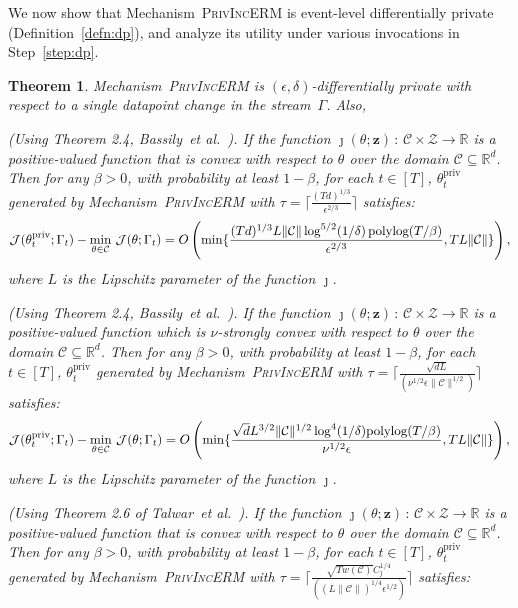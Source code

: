\documentclass{article}
\theoremstyle{plain}
\newenvironment{CompactEnumerate}{
\addtolength{\textheight}{.8in}
\addtolength{\textwidth}{.8in}
\addtolength{\oddsidemargin}{-.4in}
\addtolength{\evensidemargin}{-.4in}
\addtolength{\topmargin}{-.2in}

\begin{list}{\arabic{enumi}.}{%
\usecounter{enumi}
\setlength{\leftmargin}{12pt}
\setlength{\itemindent}{3pt}
\setlength{\topsep}{3pt}
\setlength{\itemsep}{1pt}
}}
{\end{list}}
\newtheorem{theorem}{Theorem}[section]
\def \PrivIncERM {\textsc{PrivIncERM}\xspace}
\def \polylog{\mbox{\rm polylog}}
\def \eps {\epsilon}
\def \z {\mathbf z}
\def \CCC {\mathcal{C}}
\def \ZZZ {\mathcal{Z}}
\def \JJJ {\mathcal{J}}
\def \priv {{\mathrm{priv}}}
\def \R {\mathbb{R}}
\begin{document}
We now show that Mechanism~\PrivIncERM is event-level differentially private (Definition~\ref{defn:dp}), and analyze its utility under various invocations in Step~\ref{step:dp}. 
\begin{theorem} \label{thm:thm1}  Mechanism~\PrivIncERM is $(\eps,\delta)$-differentially private with respect to a single datapoint change in the stream~$\Gamma$. Also,
\begin{CompactEnumerate}
\item \label{res:incerm1} (Using Theorem 2.4, Bassily~\emph{et al.}\ \cite{bassily2014differentially}).  If the function $\jmath(\theta;\z) \,:\, \CCC \times \ZZZ \rightarrow \R$ is a positive-valued function that is convex with respect to $\theta$ over the domain $\CCC \subseteq \R^d$. Then for any $\beta > 0$, with probability at least $1-\beta$, for each $t \in [T]$, $\theta^\priv_t$ generated by Mechanism~\PrivIncERM with $\tau = \lceil \frac{(Td)^{1/3}}{\eps^{2/3}} \rceil$ satisfies:
\begin{align*}
\JJJ(\theta^\priv_t; \Gamma_t) - \min_{\theta \in \CCC}\, \JJJ(\theta; \Gamma_t)  = O \left ( \min \{ \frac{(Td)^{1/3} L \| \CCC \| \log^{5/2}(1/\delta) \, \polylog(T/\beta)}{\eps^{2/3}}, T L \| \CCC \| \} \right),
\end{align*}
where $L$ is the Lipschitz parameter of the function $\jmath$.
\item \label{res:incerm2} (Using Theorem 2.4, Bassily~\emph{et al.}\ \cite{bassily2014differentially}). If the function $\jmath(\theta;\z) \,:\, \CCC \times \ZZZ \rightarrow \R$ is a positive-valued function which is $\nu$-strongly convex with respect to  $\theta$ over the domain $\CCC \subseteq \R^d$. Then for any $\beta > 0$, with probability at least $1-\beta$, for each $t \in [T]$, $\theta^\priv_t$ generated by Mechanism~\PrivIncERM with $\tau = \lceil \frac{\sqrt{d L}}{(\nu^{1/2} \eps \| \CCC \|^{1/2})} \rceil $ satisfies:
\begin{align*}
\JJJ(\theta^\priv_t; \Gamma_t) - \min_{\theta \in \CCC}\, \JJJ(\theta; \Gamma_t) = O \left ( \min \{\frac{\sqrt{d} L^{3/2} \| \CCC \|^{1/2} \log^4(1/\delta)\polylog(T/\beta)}{\nu^{1/2} \eps}, TL \| \CCC \| \} \right ),
\end{align*}
where $L$ is the Lipschitz parameter of the function $\jmath$.
\item \label{res:incerm3} (Using Theorem 2.6 of Talwar~\emph{et al.}\ \cite{talwar2015nearly}). If the function $\jmath(\theta;\z) \,:\, \CCC \times \ZZZ \rightarrow \R$ is a positive-valued function that is convex with respect to $\theta$ over the domain $\CCC \subseteq \R^d$. Then for any $\beta > 0$, with probability at least $1-\beta$, for each $t \in [T]$, $\theta^\priv_t$ generated by Mechanism~\PrivIncERM with $\tau = \lceil \frac{\sqrt{Tw(\CCC)}C_\jmath^{1/4}}{((L\|\CCC\|)^{1/4}\eps^{1/2})} \rceil$ satisfies:

\end{CompactEnumerate}
\end{theorem}
\end{document}
